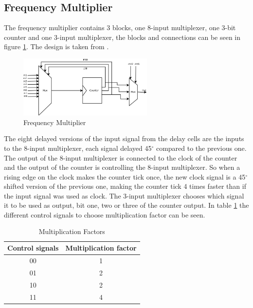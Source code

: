 \documentclass[a4paper,12pt]{article} \usepackage{graphicx}
\newcommand{\degree}{\ensuremath{^\circ}}
\begin{document}
\subsection{Frequency Multiplier}
The frequency multiplier contains 3 blocks, one 8-input multiplexer, one 3-bit
counter and one 3-input multiplexer, the blocks and connections can be seen in 
figure \ref{fig:freq_mult}. The design is taken from \cite{dll_clock}.
\begin{figure}[h!b]
        \centering
        \includegraphics[width=0.6\textwidth]{../Bilder/freq_mult_high.png}
        \caption{Frequency Multiplier}
        \label{fig:freq_mult}
\end{figure}
The eight delayed versions of the input signal from the delay cells
are the inputs to the 8-input multiplexer, each signal delayed 45\degree 
compared to the previous one. The output of the 8-input multiplexer is 
connected to the clock of the counter and the output of the counter is 
controlling the 8-input multiplexer. So when a rising edge on the clock
makes the counter tick once, the new clock signal is a 45\degree shifted
version of the previous one, making the counter tick 4 times faster than
if the input signal was used as clock. The 3-input multiplexer chooses which 
signal it to be used as output, bit one, two or three of the counter output. 
In table \ref{tab:mult_fact} the different control signals to choose 
multiplication factor can be seen.
\begin{table}[h!]
        \centering
        \begin{tabular}{|c|c|}
                \hline
                \textbf{Control signals} & \textbf{Multiplication factor} \\
                \hline
                00 & 1 \\
                01 & 2 \\
                10 & 2 \\
                11 & 4 \\
                \hline
        \end{tabular}
        \caption{Multiplication Factors}
        \label{tab:mult_fact}
\end{table}
\end{document}
